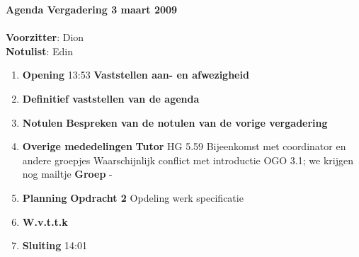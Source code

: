 \documentclass[11pt,oneside,a4paper]{article}
\begin{document}
\textbf{{\LARGE{Agenda Vergadering 3 maart 2009}}}\\ \\
\textbf{Voorzitter}: Dion\\
\textbf{Notulist}: Edin\\
\begin{enumerate}
    \item \textbf{Opening} 13:53
        \subitem \textbf{Vaststellen aan- en afwezigheid}
    \item \textbf{Definitief vaststellen van de agenda}
    \item \textbf{Notulen}
        \subitem \textbf{Bespreken van de notulen van de vorige vergadering}
    \item \textbf{Overige mededelingen}
        \subitem \textbf{Tutor}
             HG 5.59 Bijeenkomst met coordinator en andere groepjes
            \subsubitem Waarschijnlijk conflict met introductie OGO 3.1; we krijgen nog mailtje
        \subitem \textbf{Groep}
            \subsubitem -
    \item \textbf{Planning}
        \subitem \textbf{Opdracht 2}
            \subsubitem Opdeling werk specificatie
    \item \textbf{W.v.t.t.k}
    \item \textbf{Sluiting} 14:01
\end{enumerate}
\end{document}
